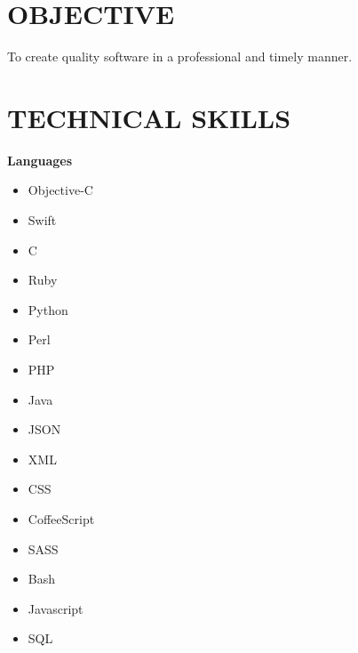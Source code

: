 \documentclass{res}
\begin{document}
 


\address{\bf  PRESENT ADDRESS\\11 Baltimore Blvd.\\Sea Girt, NJ 08750\\(772) 643-2443}
\address{\bf PERMANENT ADDRESS \\ 430 Easy Street \\  Sebastian, FL 32958 \\ (772) 643-2443}
                                  
\begin{resume}

\section{OBJECTIVE}          
    To create quality software in a professional and timely manner.

\section{TECHNICAL SKILLS}
    \textbf{Languages}
   \vspace{-0.1in}	
    \begin{multicols}{4}
        \begin{itemize}
            \item Objective-C
            \item Swift
            \item C
            \item Ruby
            \item Python
            \item Perl
            \item PHP
            \item Java
            \item JSON
            \item XML
            \item CSS
            \item CoffeeScript
            \item SASS
            \item Bash
            \item Javascript
            \item SQL
        \end{itemize}
    \end{multicols}


\end{resume}
\end{document}

